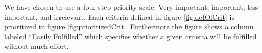 We have chosen to use a four step priority scale: Very important, important, less important, and irrelevant.
Each criteria defined in figure \ref{fig:defOfCrit} is prioritized in figure \ref{fig:prioritizedCrit}. Furthermore the figure shows a column labeled ``Easily Fulfilled'' which specifies whether a given criteria will be fulfilled without much effort.

